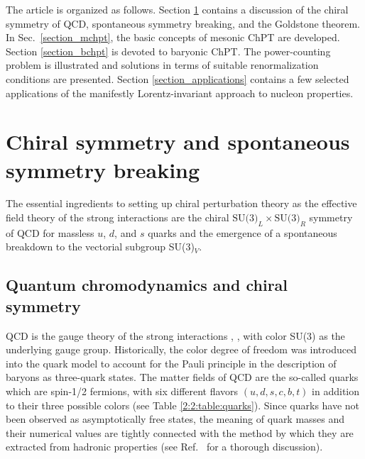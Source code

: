 \documentclass[twoside,12pt]{article}
\begin{document}
   The article is organized as follows.
   Section \ref{section_chiral symmetry} contains a discussion of the chiral symmetry
of QCD, spontaneous symmetry breaking, and the Goldstone theorem.
   In Sec.\ \ref{section_mchpt}, the basic concepts of mesonic ChPT
are developed.
   Section \ref{section_bchpt} is devoted to baryonic ChPT.
   The power-counting problem is illustrated and solutions in terms of suitable
renormalization conditions are presented.
   Section \ref{section_applications} contains a few selected applications of
the manifestly Lorentz-invariant approach to nucleon properties.


\section{Chiral symmetry and spontaneous symmetry breaking}
\label{section_chiral symmetry}
   The essential ingredients to setting up chiral perturbation theory
as the effective field theory of the strong interactions are the
chiral $\mbox{SU(3)}_L\times\mbox{SU(3)}_R$ symmetry of QCD for
massless $u$, $d$, and $s$ quarks and the emergence of a spontaneous
breakdown to the vectorial subgroup SU(3)$_V$.


\subsection{Quantum chromodynamics and chiral symmetry}
   QCD is the gauge theory of the strong interactions
\cite{Gross:1973id:2}, \cite{Weinberg:un:2},\linebreak \cite{Fritzsch:pi:2} with color SU(3)
as the underlying gauge group.
   Historically, the color
degree of freedom was introduced into the quark model to account for
the Pauli principle in the description of baryons as three-quark
states.
   The matter fields of QCD are the so-called quarks which are
spin-1/2 fermions, with six different flavors $(u, d, s, c, b, t)$ in addition to their
three possible colors (see Table \ref{2:2:table:quarks}).
   Since quarks have not been observed as asymptotically free
states, the meaning of quark masses and their numerical values are
tightly connected with the method by which they are extracted from
hadronic properties (see Ref.\ \cite{Manohar_PDG} for a thorough
discussion).
\end{document}

